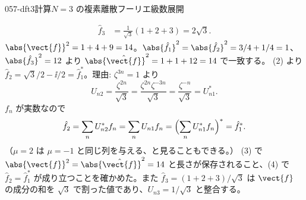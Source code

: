 \documentclass[uplatex,dvipdfmx,a4paper,11pt]{jsarticle}
\begin{document}
\begin{mondai}{057-dft3}{計算}{$N=3$ の複素離散フーリエ級数展開}
\begin{tadashii}
\begin{align*}
\hat{f}_3&=\frac{1}{\sqrt{3}}(1+2+3)=2\sqrt{3}.
\end{align*}
 $\abs{\vect{f}}^{2}=1+4+9=14$。$\abs{\hat{f}_1}^{2}=\abs{\hat{f}_2}^{2}=3/4+1/4=1$、$\abs{\hat{f}_3}^{2}=12$ より $\abs{\hat{\vect{f}}}^{2}=1+1+12=14$ で一致する。
 (2) より $\hat{f}_2=\sqrt{3}/2-\ii/2=\hat{f}_1^{*}$。理由: $\zeta^{3n}=1$ より
\[
U_{n2}=\frac{\zeta^{2n}}{\sqrt{3}}=\frac{\zeta^{2n}\zeta^{-3n}}{\sqrt{3}}=\frac{\zeta^{-n}}{\sqrt{3}}=U_{n1}^{*}.
\]
$f_n$ が実数なので
\[
\hat{f}_2=\sum_n U_{n2}^{*}f_n=\sum_n U_{n1}f_n=\Bigl(\sum_n U_{n1}^{*}f_n\Bigr)^{*}=\hat{f}_1^{*}.
\]
（$\mu=2$ は $\mu=-1$ と同じ列を与える、と見ることもできる。）
\kenzan (3) で $\abs{\vect{f}}^{2}=\abs{\hat{\vect{f}}}^{2}=14$ と長さが保存されること、(4) で $\hat{f}_2=\hat{f}_1^{*}$ が成り立つことを確かめた。また $\hat{f}_3=(1+2+3)/\sqrt{3}$ は $\vect{f}$ の成分の和を $\sqrt{3}$ で割った値であり、$U_{n3}=1/\sqrt{3}$ と整合する。
\end{tadashii}
\end{mondai}
\end{document}
